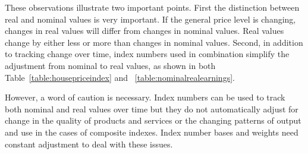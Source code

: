 These observations illustrate two important points. First the distinction between real and nominal values is very important. If the general price level is changing, changes in real values will differ from changes in nominal values. Real values change by either less or more than changes in nominal values. Second, in addition to tracking change over time, index numbers used in combination simplify the adjustment from nominal to real values, as shown in both Table~\ref{table:housepriceindex} and ~\ref{table:nominalrealearnings}.

However, a word of caution is necessary. Index numbers can be used to track both nominal and real values over time but they do not automatically adjust for change in the quality of products and services or the changing patterns of output and use in the cases of composite indexes. Index number bases and weights need constant adjustment to deal with these issues. 

